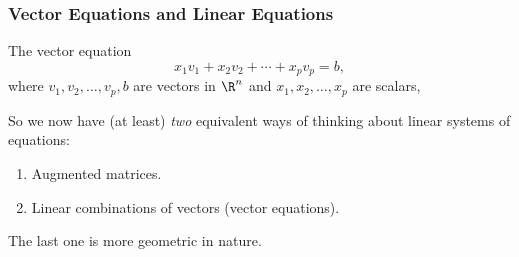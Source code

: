 
\begin{frame}
\frametitle{Vector Equations and Linear Equations}

\vskip-7mm\null
\begin{bluebox}[Summary]{.8\textwidth}
  The vector equation
  \[ x_1v_1 + x_2v_2 + \cdots + x_p v_p = b, \]
  where $v_1,v_2,\ldots,v_p,b$ are vectors in $\R^n$ and $x_1,x_2,\ldots,x_p$
  are scalars, 
\end{bluebox}

\pause[3]%
So we now have (at least) \emph{two} equivalent ways of thinking about linear
systems of equations:
\begin{enumerate}
  \pause
\item Augmented matrices.
  \pause
\item Linear combinations of vectors (vector equations).
\end{enumerate}

\pause
The last one is more geometric in nature.


\end{frame}



